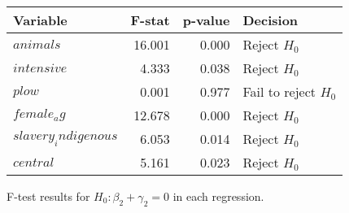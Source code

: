 \centering
\begin{tabular}{lrrl}
\hline
Variable & F-stat & p-value & Decision \\
\hline
$animals$ & 16.001 & 0.000 & Reject $H_0$ \\
$intensive$ & 4.333 & 0.038 & Reject $H_0$ \\
$plow$ & 0.001 & 0.977 & Fail to reject $H_0$ \\
$female_ag$ & 12.678 & 0.000 & Reject $H_0$ \\
$slavery_indigenous$ & 6.053 & 0.014 & Reject $H_0$ \\
$central$ & 5.161 & 0.023 & Reject $H_0$ \\
\hline
\end{tabular}
\caption{F-test results for $H_0: \beta_2 + \gamma_2 = 0$ in each regression.}
\label{tab:Ftest_results}
